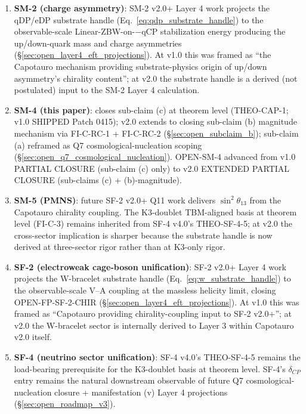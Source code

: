 \documentclass[11pt,letterpaper]{article}
\begin{document}
\begin{enumerate}\setlength\itemsep{0.2em}\setcounter{enumi}{3}
    \item \textbf{SM-2 (charge asymmetry)}: SM-2 v2.0+ Layer 4 work projects the qDP/eDP substrate handle (Eq.~\eqref{eq:qdp_substrate_handle}) to the observable-scale Linear-ZBW-on-$-$qCP stabilization energy producing the up/down-quark mass and charge asymmetries (\S\ref{sec:open_layer4_eft_projections}). At v1.0 this was framed as ``the Capotauro mechanism providing substrate-physics origin of up/down asymmetry's chirality content''; at v2.0 the substrate handle is a derived (not postulated) input to the SM-2 Layer 4 calculation.
    \item \textbf{SM-4 (this paper)}: closes sub-claim (c) at theorem level (THEO-CAP-1; v1.0 SHIPPED Patch 0415); v2.0 extends to closing sub-claim (b) magnitude mechanism via FI-C-RC-1 + FI-C-RC-2 (\S\ref{sec:open_subclaim_b}); sub-claim (a) reframed as Q7 cosmological-nucleation scoping (\S\ref{sec:open_q7_cosmological_nucleation}). OPEN-SM-4 advanced from v1.0 PARTIAL CLOSURE (sub-claim (c) only) to v2.0 EXTENDED PARTIAL CLOSURE (sub-claims (c) + (b)-magnitude).
    \item \textbf{SM-5 (PMNS)}: future SF-2 v2.0+ Q11 work delivers $\sin^2\theta_{13}$ from the Capotauro chirality coupling. The K3-doublet TBM-aligned basis at theorem level (FI-C-3) remains inherited from SF-4 v4.0's THEO-SF-4-5; at v2.0 the cross-sector implication is sharper because the substrate handle is now derived at three-sector rigor rather than at K3-only rigor.
    \item \textbf{SF-2 (electroweak cage-boson unification)}: SF-2 v2.0+ Layer 4 work projects the W-bracelet substrate handle (Eq.~\eqref{eq:w_substrate_handle}) to the observable-scale V--A coupling at the massless helicity limit, closing OPEN-FP-SF-2-CHIR (\S\ref{sec:open_layer4_eft_projections}). At v1.0 this was framed as ``Capotauro providing chirality-coupling input to SF-2 v2.0+''; at v2.0 the W-bracelet sector is internally derived to Layer 3 within Capotauro v2.0 itself.
    \item \textbf{SF-4 (neutrino sector unification)}: SF-4 v4.0's THEO-SF-4-5 remains the load-bearing prerequisite for the K3-doublet basis at theorem level. SF-4's $\delta_{CP}$ entry remains the natural downstream observable of future Q7 cosmological-nucleation closure + manifestation (v) Layer 4 projections (\S\ref{sec:open_roadmap_v3}).
\end{enumerate}
\end{document}
